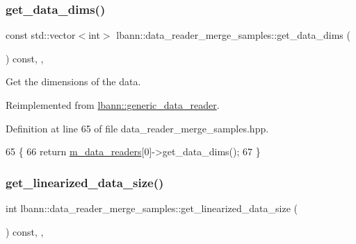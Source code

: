 \subsubsection{\texorpdfstring{get\+\_\+data\+\_\+dims()}{get\_data\_dims()}}
{\footnotesize\ttfamily const std\+::vector$<$int$>$ lbann\+::data\+\_\+reader\+\_\+merge\+\_\+samples\+::get\+\_\+data\+\_\+dims (\begin{DoxyParamCaption}{ }\end{DoxyParamCaption}) const\hspace{0.3cm}{\ttfamily [inline]}, {\ttfamily [override]}, {\ttfamily [virtual]}}



Get the dimensions of the data. 



Reimplemented from \hyperlink{classlbann_1_1generic__data__reader_ae06ff27459ac4a5d8ac14655d4b31318}{lbann\+::generic\+\_\+data\+\_\+reader}.



Definition at line 65 of file data\+\_\+reader\+\_\+merge\+\_\+samples.\+hpp.


\begin{DoxyCode}
65                                                       \{
66     \textcolor{keywordflow}{return} \hyperlink{classlbann_1_1generic__compound__data__reader_a9815e94ade5873415fd766e09d956d5b}{m\_data\_readers}[0]->get\_data\_dims();
67   \}
\end{DoxyCode}
\mbox{\label{classlbann_1_1data__reader__merge__samples_ae27598202866c365744f21f736421eaa}} 
\subsubsection{\texorpdfstring{get\+\_\+linearized\+\_\+data\+\_\+size()}{get\_linearized\_data\_size()}}
{\footnotesize\ttfamily int lbann\+::data\+\_\+reader\+\_\+merge\+\_\+samples\+::get\+\_\+linearized\+\_\+data\+\_\+size (\begin{DoxyParamCaption}{ }\end{DoxyParamCaption}) const\hspace{0.3cm}{\ttfamily [inline]}, {\ttfamily [override]}, {\ttfamily [virtual]}}




